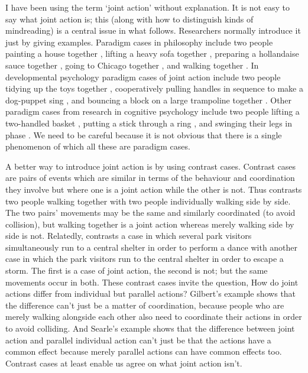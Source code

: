 \documentclass[12pt,\papersize]{extarticle}
\begin{document}
I have been using the term `joint action' without explanation. 
It is not easy to say what joint action is; this (along with how to distinguish kinds of mindreading) is a central issue in what follows. 
Researchers normally introduce it just by giving examples.  Paradigm cases in philosophy include two people 
	painting a house together \citep{Bratman:1992mi},
	lifting a heavy sofa together  \citep{Velleman:1997oo},
	preparing a hollandaise sauce together \citep{Searle:1990em},
	going to Chicago together \citep{Kutz:2000si},
	and walking together \citep{gilbert_walking_1990}.
In developmental psychology paradigm cases of joint action include  two people 
	tidying up the toys together \citep{Behne:2005qh},
	cooperatively pulling handles in sequence to make a dog-puppet sing \citep{Brownell:2006gu},
	and bouncing a block on a large trampoline together \citep{Tomasello:2007gl}.
Other paradigm cases from research in cognitive psychology include two people
	lifting a two-handled basket  \citep{Knoblich:2008hy},
	putting a stick through a ring \citep{ramenzoni_joint_2011},
	and swinging their legs in phase \citep%
	{schmidt_richardons:_2008}.
We need to be careful because it is not obvious that there is a single phenomenon of which all these are paradigm cases. 

A better way to introduce joint action is by using contrast cases.
Contrast cases are pairs of events which are similar in terms of the behaviour and coordination they involve but where one is a joint action while the other is not.  
Thus \citet{gilbert_walking_1990} contrasts two people walking together with two people individually walking side by side.  
The two pairs' movements may be the same and similarly coordinated (to avoid collision), but walking together is a joint action whereas merely walking side by side is not. 
Relatedly,  \citet{Searle:1990em}  contrasts a case in which several park visitors simultaneously run to a central shelter in order to perform a dance with another case in which the park visitors run to the central shelter in order to escape a storm.  The first is a case of joint action, the second is not; but the same movements occur in both.  
These contrast cases invite the question, 
How do joint actions differ from individual but parallel actions? 
Gilbert's example shows that the difference can’t just be a matter of coordination, because people who are merely walking alongside each other also need to coordinate their actions in order to avoid colliding.  
And Searle's example shows that the difference between joint action and parallel individual action can’t just be that the actions have a common effect because merely parallel actions can have common effects too. 
Contrast cases at least enable us agree on what joint action isn't.
\end{document}
